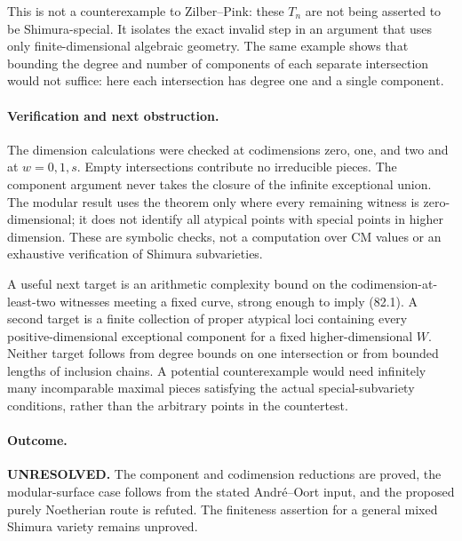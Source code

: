 \documentclass[11pt]{article}
\begin{document}
This is not a counterexample to Zilber--Pink: these $T_n$ are not being asserted to be Shimura-special. It isolates the exact invalid step in an argument that uses only finite-dimensional algebraic geometry. The same example shows that bounding the degree and number of components of each separate intersection would not suffice: here each intersection has degree one and a single component.

\paragraph{Verification and next obstruction.}
The dimension calculations were checked at codimensions zero, one, and two and at $w=0,1,s$. Empty intersections contribute no irreducible pieces. The component argument never takes the closure of the infinite exceptional union. The modular result uses the theorem only where every remaining witness is zero-dimensional; it does not identify all atypical points with special points in higher dimension. These are symbolic checks, not a computation over CM values or an exhaustive verification of Shimura subvarieties.

A useful next target is an arithmetic complexity bound on the codimension-at-least-two witnesses meeting a fixed curve, strong enough to imply (82.1). A second target is a finite collection of proper atypical loci containing every positive-dimensional exceptional component for a fixed higher-dimensional $W$. Neither target follows from degree bounds on one intersection or from bounded lengths of inclusion chains. A potential counterexample would need infinitely many incomparable maximal pieces satisfying the actual special-subvariety conditions, rather than the arbitrary points in the countertest.

\paragraph{Outcome.}
\textbf{UNRESOLVED.} The component and codimension reductions are proved, the modular-surface case follows from the stated Andr\'e--Oort input, and the proposed purely Noetherian route is refuted. The finiteness assertion for a general mixed Shimura variety remains unproved.
\end{document}
